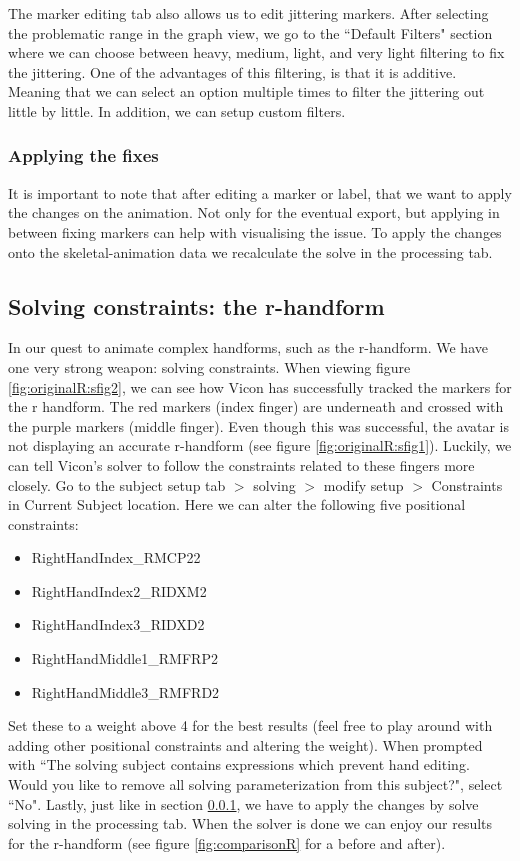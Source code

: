 \documentclass{uva-inf-article}
\begin{document}
The marker editing tab also allows us to edit jittering markers. After selecting the problematic range in the graph view, we go to the ``Default Filters" section where we can choose between heavy, medium, light, and very light filtering to fix the jittering. One of the advantages of this filtering, is that it is additive. Meaning that we can select an option multiple times to filter the jittering out little by little. In addition, we can setup custom filters.

\subsubsection{Applying the fixes}\label{sec:applyFix}
It is important to note that after editing a marker or label, that we want to apply the changes on the animation. Not only for the eventual export, but applying in between fixing markers can help with visualising the issue. To apply the changes onto the skeletal-animation data we recalculate the solve in the processing tab.

\subsection{Solving constraints: the r-handform}
In our quest to animate complex handforms, such as the r-handform. We have one very strong weapon: solving constraints. When viewing figure \ref{fig:originalR:sfig2}, we can see how Vicon has successfully tracked the markers for the r handform. The red markers (index finger) are underneath and crossed with the purple markers (middle finger). Even though this was successful, the avatar is not displaying an accurate r-handform (see figure \ref{fig:originalR:sfig1}). Luckily, we can tell Vicon's solver to follow the constraints related to these fingers more closely. Go to the subject setup tab $>$ solving $>$ modify setup $>$ Constraints in Current Subject location. Here we can alter the following five positional constraints:
\begin{itemize}
    \item RightHandIndex\_RMCP22
    \item RightHandIndex2\_RIDXM2
    \item RightHandIndex3\_RIDXD2
    \item RightHandMiddle1\_RMFRP2
    \item RightHandMiddle3\_RMFRD2
\end{itemize}
Set these to a weight above 4 for the best results (feel free to play around with adding other positional constraints and altering the weight). When prompted with ``The solving subject contains expressions which prevent hand editing. Would you like to remove all solving parameterization from this subject?", select ``No". Lastly, just like in section \ref{sec:applyFix}, we have to apply the changes by solve solving in the processing tab. When the solver is done we can enjoy our results for the r-handform (see figure \ref{fig:comparisonR} for a before and after).
\end{document}

